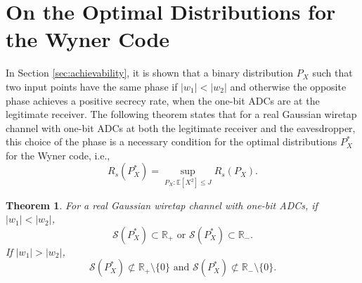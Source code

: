 \documentclass[journal]{IEEEtran}
\newtheorem{theorem}{Theorem}[section]
\begin{document}
\section{On the Optimal Distributions for the Wyner Code} \label{sec:optimal_support}
In Section \ref{sec:achievability}, it is shown that a binary distribution $P_X$ such that two input points have the same phase if $|w_1|<|w_2|$ and otherwise the opposite phase achieves a positive secrecy rate, when the one-bit ADCs are at the legitimate receiver. The following theorem states that  for a real Gaussian wiretap channel with one-bit ADCs at both the legitimate receiver and the eavesdropper, this choice of the phase is a necessary condition for the optimal distributions $P_X^*$ for the Wyner code, i.e.,
\begin{equation}
    R_s(P_X^*) = \sup\limits_{P_X:\mathbb{E}[X^2]\leq J} R_s(P_X). \label{eq:P_star}
\end{equation}

\begin{theorem}\label{Thm:optimal_support}
For a real Gaussian wiretap channel with one-bit ADCs, if $|w_1|<|w_2|$,
\begin{equation}
    \mathcal{S}(P_X^*) \subset \mathbb{R}_+ \text{ or } \mathcal{S}(P_X^*) \subset \mathbb{R}_-. \label{eq:Thm4.1_1}
\end{equation}
If $|w_1|>|w_2|$,
\begin{equation}
    \mathcal{S}(P_X^*) \not\subset \mathbb{R}_+ \setminus \{0\} \text{ and } \mathcal{S}(P_X^*) \not\subset \mathbb{R}_- \setminus \{0\}. \label{eq:Thm4.1_2}
\end{equation}
\end{theorem}
\end{document}
